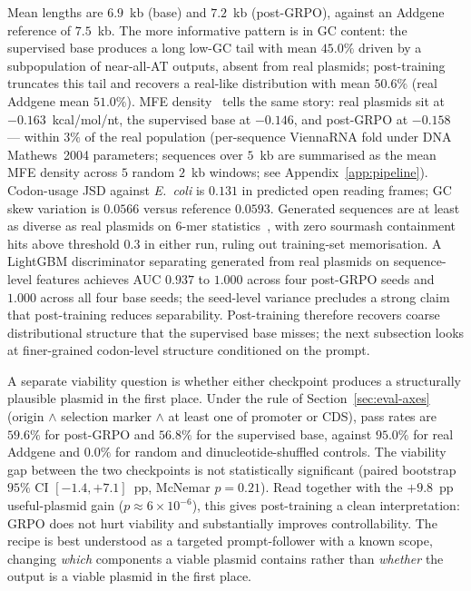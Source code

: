 \documentclass{article}
\begin{document}
Mean lengths are $6.9$~kb (base) and $7.2$~kb (post-GRPO), against an Addgene reference
of $7.5$~kb. The more informative pattern is in GC content: the supervised base
produces a long low-GC tail with mean $45.0\%$ driven by a subpopulation of
near-all-AT outputs, absent from real plasmids; post-training truncates this tail and
recovers a real-like distribution with mean $50.6\%$ (real Addgene mean
$51.0\%$). MFE density~\citep{lorenz2011viennarna} tells the same story: real plasmids
sit at $-0.163$~kcal/mol/nt, the supervised base at $-0.146$, and post-GRPO at
$-0.158$ --- within $3\%$ of the real population (per-sequence ViennaRNA fold under DNA
Mathews~2004 parameters; sequences over $5$~kb are summarised as the mean MFE density
across $5$ random $2$~kb windows; see Appendix~\ref{app:pipeline}). Codon-usage JSD
against \textit{E.~coli} is $0.131$ in predicted open reading frames; GC skew variation
is $0.0566$ versus reference $0.0593$. Generated sequences are at least as diverse as
real plasmids on $6$-mer statistics~\citep{brown2016sourmash}, with zero sourmash
containment hits above threshold $0.3$ in either run, ruling out training-set
memorisation. A LightGBM discriminator separating generated from real plasmids on
sequence-level features achieves AUC $0.937$ to $1.000$ across four post-GRPO seeds and
$1.000$ across all four base seeds; the seed-level variance precludes a strong claim
that post-training reduces separability. Post-training therefore recovers coarse
distributional structure that the supervised base misses; the next subsection looks at
finer-grained codon-level structure conditioned on the prompt.

A separate viability question is whether either checkpoint produces a structurally
plausible plasmid in the first place. Under the rule of Section~\ref{sec:eval-axes}
(origin $\wedge$ selection marker $\wedge$ at least one of promoter or CDS), pass rates
are $59.6\%$ for post-GRPO and $56.8\%$ for the supervised base, against $95.0\%$ for
real Addgene and $0.0\%$ for random and dinucleotide-shuffled controls. The viability
gap between the two checkpoints is not statistically significant (paired bootstrap
$95\%$ CI $[-1.4, +7.1]$~pp, McNemar $p{=}0.21$). Read together with the $+9.8$~pp
useful-plasmid gain ($p \approx 6 \times 10^{-6}$), this gives post-training a clean
interpretation: GRPO does not hurt viability and substantially improves controllability.
The recipe is best understood as a targeted prompt-follower with a known scope, changing
\emph{which} components a viable plasmid contains rather than \emph{whether} the output
is a viable plasmid in the first place.
\end{document}
